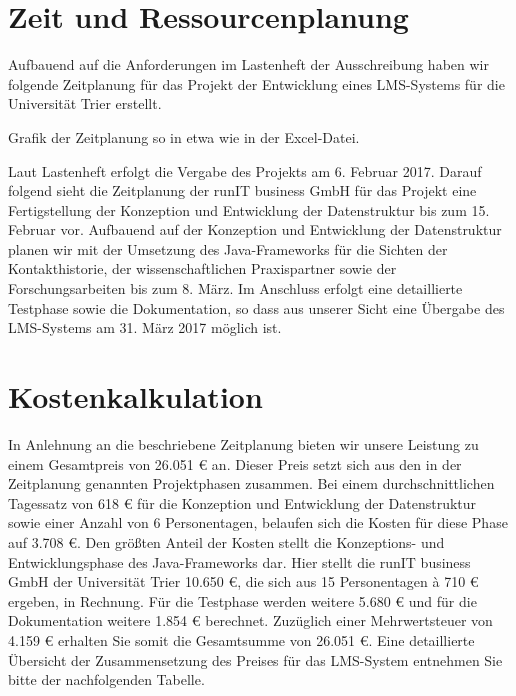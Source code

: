 \documentclass[10pt,a4paper]{article}
\begin{document}
\section{Zeit und Ressourcenplanung}
Aufbauend auf die Anforderungen im Lastenheft der Ausschreibung haben wir folgende Zeitplanung für das Projekt der Entwicklung eines LMS-Systems für die Universität Trier erstellt.

Grafik der Zeitplanung so in etwa wie in der Excel-Datei.

Laut Lastenheft erfolgt die Vergabe des Projekts am 6. Februar 2017. Darauf folgend sieht die Zeitplanung der runIT business GmbH für das Projekt eine Fertigstellung der Konzeption und Entwicklung der Datenstruktur bis zum 15. Februar vor. Aufbauend auf der Konzeption und Entwicklung der Datenstruktur planen wir mit der Umsetzung des Java-Frameworks für die Sichten der Kontakthistorie, der wissenschaftlichen Praxispartner sowie der Forschungsarbeiten bis zum 8. März. Im Anschluss erfolgt eine detaillierte Testphase sowie die Dokumentation, so dass aus unserer Sicht eine Übergabe des LMS-Systems am 31. März 2017 möglich ist. 

\section{Kostenkalkulation}
In Anlehnung an die beschriebene Zeitplanung bieten wir unsere Leistung zu einem Gesamtpreis von 26.051 \euro{} an. Dieser Preis setzt sich aus den in der Zeitplanung genannten Projektphasen zusammen. Bei einem durchschnittlichen Tagessatz von 618 \euro{} für die Konzeption und Entwicklung der Datenstruktur sowie einer Anzahl von 6 Personentagen, belaufen sich die Kosten für diese Phase auf 3.708 \euro{}. Den größten Anteil der Kosten stellt die Konzeptions- und Entwicklungsphase des Java-Frameworks dar. Hier stellt die runIT business GmbH der Universität Trier 10.650 \euro{}, die sich aus 15 Personentagen à 710 \euro{} ergeben, in Rechnung. Für die Testphase werden weitere 5.680 \euro{} und für die Dokumentation weitere 1.854 \euro{} berechnet. Zuzüglich einer Mehrwertsteuer von 4.159 \euro{} erhalten Sie somit die Gesamtsumme von 26.051 \euro{}. Eine detaillierte Übersicht der Zusammensetzung des Preises für das LMS-System entnehmen Sie bitte der nachfolgenden Tabelle.
\vspace{10pt}
\end{document}
